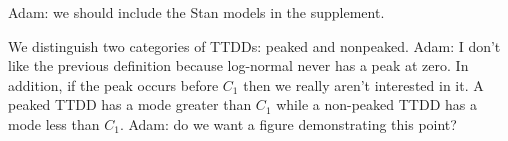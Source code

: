 \documentclass[useAMS,usenatbib,referee,12pt]{article}
\newcommand{\adam}[1]{{\color{blue} ADAM: #1}}
\newcommand{\jarad}[1]{{\color{Orange} #1}}
\newcommand{\vX}{\textbf{X}}
\newcommand{\vZ}{\textbf{Z}}
\newcommand{\vbeta}{\boldsymbol{\beta}}
\newcommand{\vxi}{\boldsymbol{\xi}}
\begin{document}
\jarad{Adam: we should include the Stan models in the supplement.}







We distinguish two categories of TTDDs: peaked and nonpeaked. \jarad{Adam: I don't like the previous definition because log-normal never has a peak at zero. In addition, if the peak occurs before $C_1$ then we really aren't interested in it.}
A peaked TTDD has a mode greater than $C_1$ while a non-peaked TTDD has a mode less than $C_1$. \jarad{Adam: do we want a figure demonstrating this point?}
\end{document}
